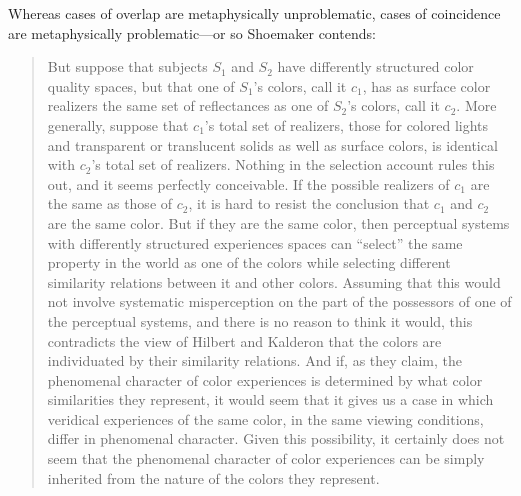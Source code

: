 \documentclass[12pt]{article}
\begin{document}
Whereas cases of overlap are metaphysically unproblematic, cases of coincidence are metaphysically problematic---or so Shoemaker contends: 
\begin{quote}
	But suppose that subjects $S_1$ and $S_2$ have differently structured color quality spaces, but that one of $S_1$'s colors, call it $c_1$, has as surface color realizers the same set of reflectances as one of $S_2$'s colors, call it $c_2$. More generally, suppose that $c_1$'s total set of realizers, those for colored lights and transparent or translucent solids as well as surface colors, is identical with $c_2$'s total set of realizers. Nothing in the selection account rules this out, and it seems perfectly conceivable. If the possible realizers of $c_1$ are the same as those of $c_2$, it is hard to resist the conclusion that $c_1$ and $c_2$ are the same color. But if they are the same color, then perceptual systems with differently structured experiences spaces can ``select'' the same property in the world as one of the colors while selecting different similarity relations between it and other colors. Assuming that this would not involve systematic misperception on the part of the possessors of one of the perceptual systems, and there is no reason to think it would, this contradicts the view of Hilbert and Kalderon that the colors are individuated by their similarity relations. And if, as they claim, the phenomenal character of color experiences is determined by what color similarities they represent, it would seem that it gives us a case in which veridical experiences of the same color, in the same viewing conditions, differ in phenomenal character. Given this possibility, it certainly does not seem that the phenomenal character of color experiences can be simply inherited from the nature of the colors they represent. \citep{Shoemaker:wk} 
\end{quote}
\end{document}
